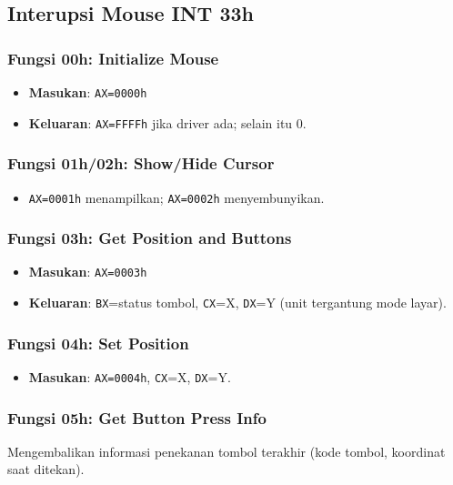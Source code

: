 \documentclass[../main.tex]{subfiles}
\begin{document}
\subsection{Interupsi Mouse INT 33h}
\subsubsection{Fungsi 00h: Initialize Mouse}
\begin{itemize}
  \item \textbf{Masukan}: \texttt{AX=0000h}
  \item \textbf{Keluaran}: \texttt{AX=FFFFh} jika driver ada; selain itu 0.
\end{itemize}

\subsubsection{Fungsi 01h/02h: Show/Hide Cursor}
\begin{itemize}
  \item \texttt{AX=0001h} menampilkan; \texttt{AX=0002h} menyembunyikan.
\end{itemize}

\subsubsection{Fungsi 03h: Get Position and Buttons}
\begin{itemize}
  \item \textbf{Masukan}: \texttt{AX=0003h}
  \item \textbf{Keluaran}: \texttt{BX}=status tombol, \texttt{CX}=X, \texttt{DX}=Y (unit tergantung mode layar).
\end{itemize}

\subsubsection{Fungsi 04h: Set Position}
\begin{itemize}
  \item \textbf{Masukan}: \texttt{AX=0004h}, \texttt{CX}=X, \texttt{DX}=Y.
\end{itemize}

\subsubsection{Fungsi 05h: Get Button Press Info}
Mengembalikan informasi penekanan tombol terakhir (kode tombol, koordinat saat ditekan).
\end{document}
